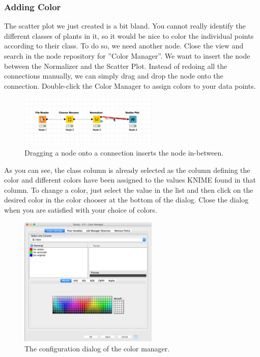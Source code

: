 \subsubsection{Adding Color}

The scatter plot we just created is a bit bland. You cannot really identify the different classes of plants in it, so it would be nice to color the individual points according to their class. To do so, we need another node. Close the view and search in the node repository for ''Color Manager''. We want to insert the node between the Normalizer and the Scatter Plot. Instead of redoing all the connections manually, we can simply drag and drop the node onto the connection. Double-click the Color Manager to assign colors to your data points.

\begin{figure}[h]
\centering
\includegraphics[width=0.59\textwidth]{graphics/knime_basics/drag_node}
\caption{Dragging a node onto a connection inserts the node in-between.}
\label{fig:drag_node}
\end{figure}

As you can see, the class column is already selected as the column defining the color and different colors have been assigned to the values KNIME found in that column. To change a color, just select the value in the list and then click on the desired color in the color chooser at the bottom of the dialog. Close the dialog when you are satisfied with your choice of colors.

\begin{figure}
\centering
\includegraphics[width=0.59\textwidth]{graphics/knime_basics/color_manager}
\caption{The configuration dialog of the color manager.}
\label{fig:color_manager}
\end{figure}

